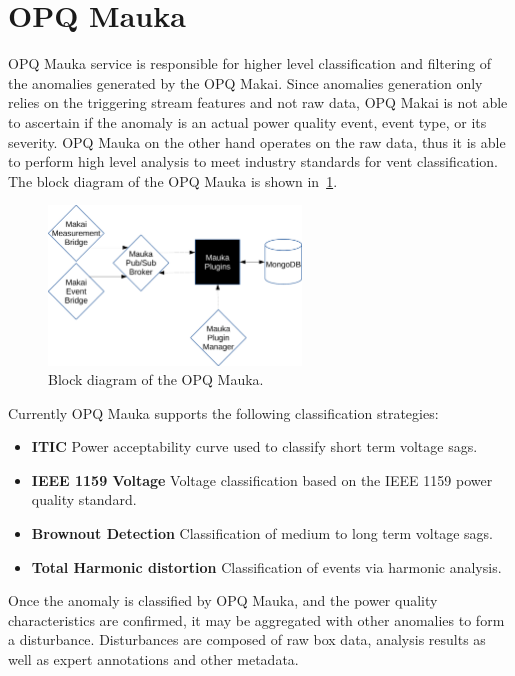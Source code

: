 \section{OPQ Mauka}\label{sec:opq-mauka}
OPQ Mauka service is responsible for higher level classification and filtering of the anomalies generated by the OPQ Makai.\cite{laha}
Since anomalies generation only relies on the triggering stream features and not raw data, OPQ Makai is not able to ascertain if the anomaly is an actual power quality event, event type, or its severity.
OPQ Mauka on the other hand operates on the raw data, thus it is able to perform high level analysis to meet industry standards for vent classification.
The block diagram of the OPQ Mauka is shown in~\ref{fig:opq:11}.
\begin{figure}[h]
  \begin{center}
  \includegraphics[width=0.6\textwidth]{img/mauka.pdf}
  \end{center}
  \caption{Block diagram of the OPQ Mauka.}
  \label{fig:opq:11}
\end{figure}

Currently OPQ Mauka supports the following classification strategies:
\begin{itemize}
	\item{\textbf{ITIC}} Power acceptability curve used to classify short term voltage sags.
	\item{\textbf{IEEE 1159 Voltage}} Voltage classification based on the IEEE 1159 power quality standard.
	\item{\textbf{Brownout Detection}} Classification of medium to long term voltage sags.
	\item{\textbf{Total Harmonic distortion}} Classification of events via harmonic analysis.
\end{itemize}

Once the anomaly is classified by OPQ Mauka, and the power quality characteristics are confirmed, it may be aggregated with other anomalies to form a disturbance.
Disturbances are composed of raw box data, analysis results as well as expert annotations and other metadata.

